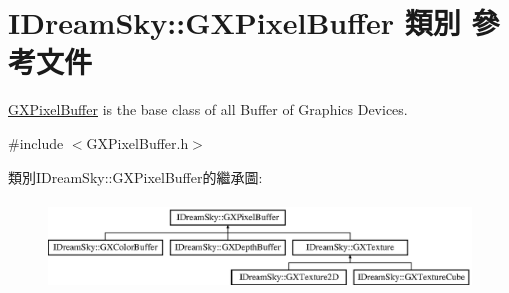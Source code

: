 \hypertarget{class_i_dream_sky_1_1_g_x_pixel_buffer}{}\section{I\+Dream\+Sky\+:\+:G\+X\+Pixel\+Buffer 類別 參考文件}
\label{class_i_dream_sky_1_1_g_x_pixel_buffer}


\hyperlink{class_i_dream_sky_1_1_g_x_pixel_buffer}{G\+X\+Pixel\+Buffer} is the base class of all Buffer of Graphics Devices.  




{\ttfamily \#include $<$G\+X\+Pixel\+Buffer.\+h$>$}

類別\+I\+Dream\+Sky\+:\+:G\+X\+Pixel\+Buffer的繼承圖\+:\begin{figure}[H]
\begin{center}
\leavevmode
\includegraphics[height=2.372881cm]{class_i_dream_sky_1_1_g_x_pixel_buffer}
\end{center}
\end{figure}
